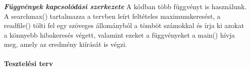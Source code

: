 \documentclass[12pt]{report}
\begin{document}
\textit{\textbf{Függvények kapcsolódási szerkezete}} \newline
A kódban több függvényt is használunk. A searchmax() tartalmazza a tervben leírt feltételes maximumkeresést, a readfile() tölti fel egy szöveges állományból a tömböt számokkal és írja ki azokat a könnyebb hibakeresés végett, valamint ezeket a függvényeket a main() hívja meg, amely az eredmény kiírását is végzi. \newline
{}
\paragraph{Tesztelési terv} \hspace{0pt} \\
\end{document}
